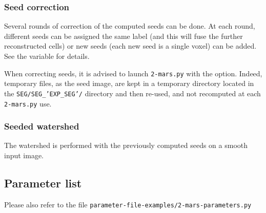 \subsubsection{Seed correction}
\label{sec:cli:mars:seed:correction}

Several rounds of correction of the computed seeds can be done. At each round, different seeds can be assigned the same label (and this will fuse the further reconstructed cells) or new seeds (each new seed is a single voxel) can be added. See the  variable for details.

When correcting seeds, it is advised to launch \texttt{2-mars.py}  with the  option. Indeed, temporary files, as the seed image, are kept in a temporary directory located in the \texttt{SEG/SEG\_'EXP\_SEG'/} directory and then re-used, and not recomputed at each \texttt{2-mars.py} use.



\subsubsection{Seeded watershed}

The watershed is performed with the previously computed seeds on a smooth input image.


\subsection{Parameter list}

Please also refer to the file
\texttt{parameter-file-examples/2-mars-parameters.py}

